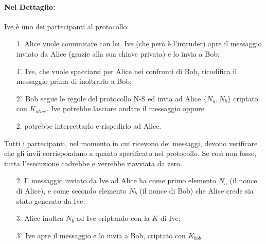 \paragraph{Nel Dettaglio: }
Ive è uno dei partecipanti al protocollo:

\begin{enumerate}
    \item[1.]  Alice vuole comunicare con lei. Ive (che però è l'intruder)
        apre il messaggio inviato da Alice
        (grazie alla sua chiave privata) e lo invia a Bob;
    \item[1'.] Ive, che vuole spacciarsi per Alice nei confronti di Bob,
        ricodifica il messaggio prima di inoltrarlo
        a Bob;
    \item[2'.] Bob segue le regole del protocollo N-S ed invia ad Alice
        \(\{N_a, N_b\}\) criptato con \(K_{alice}\). Ive
        potrebbe lasciare andare il messaggio oppure
    \item[2.] potrebbe intercettarlo e rispedirlo ad Alice.
\end{enumerate}
Tutti i partecipanti, nel momento in cui ricevono dei messaggi, devono
verificare che gli invii
corrispondano a quanto specificato nel protocollo. Se così non fosse, tutta
l'esecuzione cadrebbe e
verrebbe riavviata da zero.

\begin{enumerate}
    \item[2.] Il messaggio inviato da Ive ad Alice ha come primo
        elemento \(N_a\) (il nonce di Alice), e come secondo elemento \(N_b\)
        (il nonce di Bob) che Alice crede sia stato
        generato da Ive;
    \item[3.] Alice inoltra \(N_b\) ad Ive criptando con la \(K\) di Ive;
    \item[3'.] Ive apre il messaggio e lo invia a Bob, criptato con \(K_{bob}\)
\end{enumerate}

